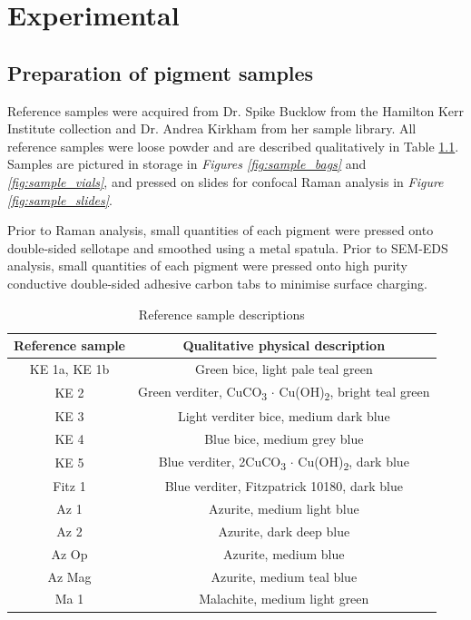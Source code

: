 
\chapter{Experimental}

\ifpdf
    \graphicspath{{Chapter2/Figs/Raster/}{Chapter2/Figs/PDF/}{Chapter2/Figs/}}
\else
    \graphicspath{{Chapter2/Figs/Vector/}{Chapter2/Figs/}}
\fi


\section[Preparation of samples]{Preparation of pigment samples}
\label{section2.1}

Reference samples were acquired from Dr. Spike Bucklow from the Hamilton Kerr Institute collection and Dr. Andrea Kirkham from her sample library. All reference samples were loose powder and are described qualitatively in Table \ref{table:ref_sample}. Samples are pictured in storage in \textit{Figures \ref{fig:sample_bags}} and \textit{\ref{fig:sample_vials}}, and pressed on slides for confocal Raman analysis in \textit{Figure \ref{fig:sample_slides}}.

Prior to Raman analysis, small quantities of each pigment were pressed onto double-sided sellotape and smoothed using a metal spatula. Prior to SEM-EDS analysis, small quantities of each pigment were pressed onto high purity conductive double-sided adhesive carbon tabs to minimise surface charging.

\begin{table}[H]
\caption{Reference sample descriptions}
\centering
\label{table:ref_sample}
\begin{tabular}{c c}
\toprule
Reference sample & Qualitative physical description \\
\midrule
KE 1a, KE 1b & Green bice, light pale teal green \\
KE 2 & Green verditer, CuCO\textsubscript{3} $\cdot$ Cu(OH)\textsubscript{2}, bright teal green \\
KE 3 & Light verditer bice, medium dark blue \\
KE 4 & Blue bice, medium grey blue \\
KE 5 & Blue verditer, 2CuCO\textsubscript{3} $\cdot$ Cu(OH)\textsubscript{2}, dark blue \\
Fitz 1 & Blue verditer, Fitzpatrick 10180, dark blue \\
Az 1 & Azurite, medium light blue \\
Az 2 & Azurite, dark deep blue \\
Az Op & Azurite, medium blue \\
Az Mag & Azurite, medium teal blue \\
Ma 1 & Malachite, medium light green \\
\bottomrule
\end{tabular}
\end{table}

